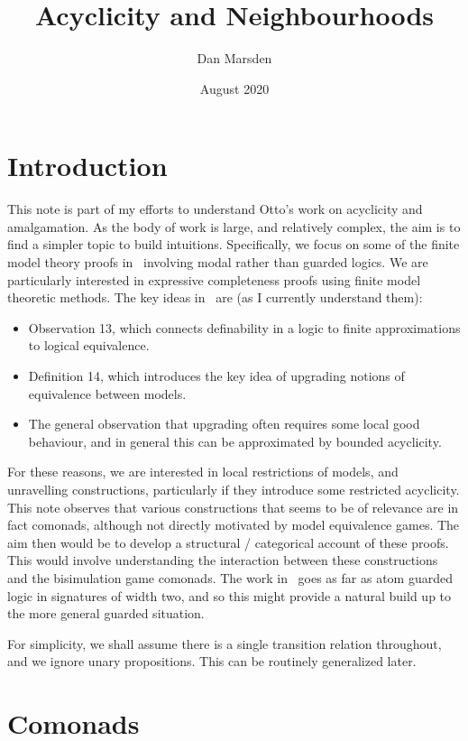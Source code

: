 \documentclass{article}
\title{Acyclicity and Neighbourhoods}
\author{Dan Marsden}
\date{August 2020}
\theoremstyle{plain}
\theoremstyle{definition}
\theoremstyle{remark}
\numberwithin{theorem}{section}
\begin{document}
\maketitle

\section{Introduction}
This note is part of my efforts to understand Otto's work on acyclicity and amalgamation. As the body of work is large, and relatively complex, the aim is to find a simpler topic to build intuitions.
Specifically, we focus on some of the finite model theory proofs in~\cite{Otto2004} involving modal rather than guarded logics. We are particularly interested in expressive completeness proofs using finite model theoretic methods. The key ideas in~\cite{Otto2004} are (as I currently understand them):
\begin{itemize}
    \item Observation 13, which connects definability in a logic to finite approximations to logical equivalence.
    \item Definition 14, which introduces the key idea of upgrading notions of equivalence between models.
    \item The general observation that upgrading often requires some local good behaviour, and in general this can be approximated by bounded acyclicity.
\end{itemize}
For these reasons, we are interested in local restrictions of models, and unravelling constructions, particularly if they introduce some restricted acyclicity. This note observes that various constructions that seems to be of relevance are in fact comonads, although not directly motivated by model equivalence games. The aim then would be to develop a structural / categorical account of these proofs. This would involve understanding the interaction between these constructions and the bisimulation game comonads. The work in~\cite{Otto2004} goes as far as atom guarded logic in signatures of width two, and so this might provide a natural build up to the more general guarded situation.

For simplicity, we shall assume there is a single transition relation throughout, and we ignore unary propositions. This can be routinely generalized later.

\section{Comonads}
\end{document}
